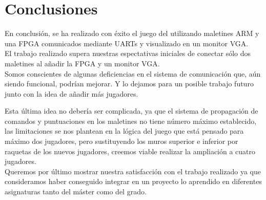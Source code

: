 \section{Conclusiones}
\label{s4:sec:Conclusiones}

En conclusión, se ha realizado con éxito el juego del \pong utilizando
maletines ARM y una FPGA comunicados mediante UARTs y visualizado en
un monitor VGA. \\

El trabajo realizado supera nuestras espectativas iniciales de
conectar sólo dos maletines al añadir la FPGA y un monitor VGA. \\

Somos conscientes de algunas deficiencias en el sistema de
comunicación que, aún siendo funcional, podrían mejorar. Y lo dejamos
para un posible trabajo futuro junto con la idea de añadir más
jugadores.

Esta última idea no debería ser complicada, ya que el sistema de
propagación de comandos y puntuaciones en los maletines no tiene
número máximo establecido, las limitaciones se nos plantean en la
lógica del juego que está pensado para máximo dos jugadores, pero
sustituyendo los muros superior e inferior por raquetas de los nuevos
jugadores, creemos viable realizar la ampliación a cuatro jugadores. \\

Queremos por último mostrar nuestra satisfacción con el trabajo
realizado ya que consideramos haber conseguido integrar en un proyecto
lo aprendido en diferentes asignaturas tanto del máster como del grado.

%
%


